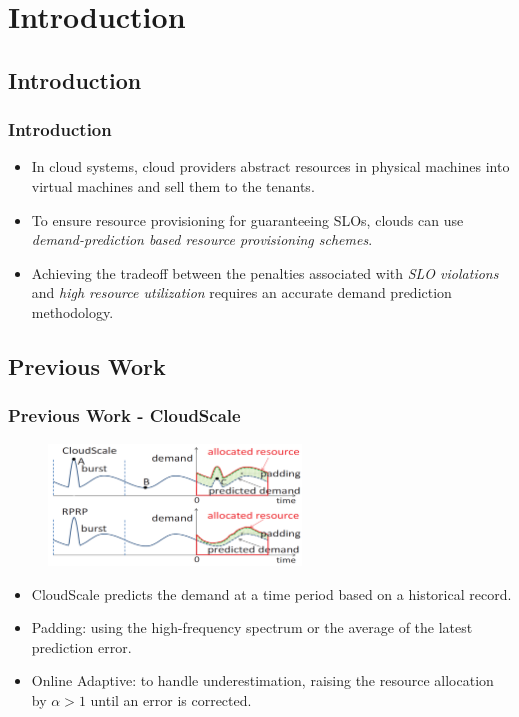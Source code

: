 \documentclass{beamer}
\begin{document}
\section{Introduction}

\subsection{Introduction}
    \begin{frame}
    \frametitle{Introduction}
		\begin{itemize}
		\item In cloud systems, cloud providers abstract resources in physical machines into virtual machines and sell them to the tenants.
		\item To ensure resource provisioning for guaranteeing SLOs\footnotemark[1], clouds can use {\it demand-prediction based resource provisioning schemes}.
		\item Achieving the tradeoff between the penalties associated with {\it SLO violations} and {\it high resource utilization} requires an accurate demand prediction methodology.
		\end{itemize}
    \end{frame}

\subsection{Previous Work}
	\begin{frame}
	\frametitle{Previous Work - CloudScale}
		\begin{figure}[h!]
		\centering
		\includegraphics[width=0.6\textwidth]{./figure/intro.PNG}
		\end{figure}
		\begin{itemize}
		\item CloudScale predicts the demand at a time period based on a historical record.
		\item Padding: using the high-frequency spectrum or the average of the latest prediction error.
		\item Online Adaptive: to handle underestimation, raising the resource allocation by $\alpha>1$ until an error is corrected.
		\end{itemize}
	\end{frame}
\end{document}
